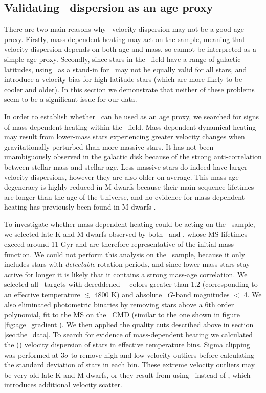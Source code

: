 \subsection{Validating \vb\ dispersion as an age proxy}
\label{sec:mass-dependent-heating}

There are two main reasons why \vb\ velocity dispersion may not be a good age
proxy.
Firstly, mass-dependent heating may act on the sample, meaning that velocity
dispersion depends on both age and mass, so cannot be interpreted as a simple
age proxy.
Secondly, since stars in the \kepler\ field have a range of galactic
latitudes, using \vb\ as a stand-in for \vz\ may not be equally valid for all
stars, and introduce a velocity bias for high latitude stars (which are more
likely to be cooler and older).
In this section we demonstrate that neither of these problems seem to be a
significant issue for our data.

In order to establish whether \sigmavb\ can be used as an age proxy, we
searched for signs of mass-dependent heating within the \kepler\ field.
Mass-dependent dynamical heating may result from lower-mass stars experiencing
greater velocity changes when gravitationally perturbed than more massive
stars.
It has not been unambiguously observed in the galactic disk because of the
strong anti-correlation between stellar mass and stellar age.
Less massive stars do indeed have larger velocity dispersions, however they
are also older on average.
This mass-age degeneracy is highly reduced in M dwarfs because their
main-sequence lifetimes are longer than the age of the Universe, and no
evidence for mass-dependent heating has previously been found in M dwarfs
\citep[\eg][]{faherty2009, newton2016}.

To investigate whether mass-dependent heating could be acting on the \kepler\
sample, we selected late K and M dwarfs observed by both \kepler\ and \gaia,
whose MS lifetimes exceed around 11 Gyr and are therefore representative of
the initial mass function.
We could not perform this analysis on the \mct\ sample, because it only
includes stars with {\it detectable} rotation periods, and since lower-mass
stars stay active for longer it is likely that it contains a strong mass-age
correlation.
We selected all \kepler\ targets with dereddened \gaia\ \gcolor\ colors
greater than 1.2 (corresponding to an effective temperature $\lesssim$
4800 K) and absolute \gaia\ $G$-band magnitudes $<$ 4.
We also eliminated photometric binaries by removing stars above a 6th order
polynomial, fit to the MS on the \gaia\ CMD (similar to the one shown in
figure \ref{fig:age_gradient}).
We then applied the quality cuts described above in section
\ref{sec:the_data}.
To search for evidence of mass-dependent heating we calculated the (\vb)
velocity dispersion of stars in effective temperature bins.
Sigma clipping was performed at 3$\sigma$ to remove high and low velocity
outliers before calculating the standard deviation of stars in each bin.
These extreme velocity outliers may be very old late K and M dwarfs, or they
result from using \vb\ instead of \vz, which introduces additional velocity
scatter.

